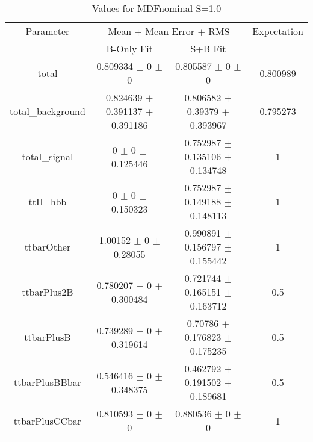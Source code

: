 \begin{table}
\centering
\caption{Values for MDFnominal S=1.0}
\begin{tabular}{cccc}
\toprule
Parameter & \multicolumn{2}{c}{Mean $\pm$ Mean Error $\pm$ RMS} & Expectation\\
 & B-Only Fit & S+B Fit & \\
\midrule
total & \num{0.809334} $\pm$ \num{0} $\pm$ \num{0} & \num{0.805587} $\pm$ \num{0} $\pm$ \num{0} & \num{0.800989}\\
total\_background & \num{0.824639} $\pm$ \num{0.391137} $\pm$ \num{0.391186} & \num{0.806582} $\pm$ \num{0.39379} $\pm$ \num{0.393967} & \num{0.795273}\\
total\_signal & \num{0} $\pm$ \num{0} $\pm$ \num{0.125446} & \num{0.752987} $\pm$ \num{0.135106} $\pm$ \num{0.134748} & \num{1}\\
ttH\_hbb & \num{0} $\pm$ \num{0} $\pm$ \num{0.150323} & \num{0.752987} $\pm$ \num{0.149188} $\pm$ \num{0.148113} & \num{1}\\
ttbarOther & \num{1.00152} $\pm$ \num{0} $\pm$ \num{0.28055} & \num{0.990891} $\pm$ \num{0.156797} $\pm$ \num{0.155442} & \num{1}\\
ttbarPlus2B & \num{0.780207} $\pm$ \num{0} $\pm$ \num{0.300484} & \num{0.721744} $\pm$ \num{0.165151} $\pm$ \num{0.163712} & \num{0.5}\\
ttbarPlusB & \num{0.739289} $\pm$ \num{0} $\pm$ \num{0.319614} & \num{0.70786} $\pm$ \num{0.176823} $\pm$ \num{0.175235} & \num{0.5}\\
ttbarPlusBBbar & \num{0.546416} $\pm$ \num{0} $\pm$ \num{0.348375} & \num{0.462792} $\pm$ \num{0.191502} $\pm$ \num{0.189681} & \num{0.5}\\
ttbarPlusCCbar & \num{0.810593} $\pm$ \num{0} $\pm$ \num{0} & \num{0.880536} $\pm$ \num{0} $\pm$ \num{0} & \num{1}\\
\bottomrule
\end{tabular}
\end{table}